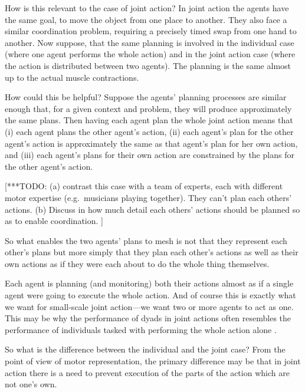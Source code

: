 \documentclass[12pt,\papersize]{extarticle}
\begin{document}
How is this relevant to the case of joint action?
In joint action the agents have the same goal, to move the object from one place to another.
They also face a similar coordination problem, requiring a precisely timed swap from one hand to another.
Now suppose, that the same planning is involved in the individual case (where one agent performs the whole action) and in the joint action case (where the action is distributed between two agents).
The planning is the same almost up to the actual muscle contractions.

How could this be helpful?
Suppose the agents' planning processes are similar enough that, for a given context and problem, they will produce approximately the same plans.
Then having each agent plan the whole joint action means that (i) each agent plans the other agent's action,
(ii) each agent's plan for the other agent's action is approximately the same as that agent's plan for her own action,
and 
(iii) each  agent's plans for their own action are constrained by the plans for the other agent's action.

[***TODO: (a) contrast this case with a team of experts, each with different motor expertise (e.g.\ musicians playing together).  
They can't plan each others' actions.
(b) Discuss in how much detail each others' actions should be planned so as to enable coordination.
]


So what enables the two agents' plans to mesh is not that they represent each other's plans but more simply that they plan each other's actions as well as their own actions as if they were each about to do the whole thing themselves.

Each agent is planning (and monitoring) both their actions almost as if a single agent were going to execute the whole action.
And of course this is exactly what we want for small-scale joint action---we want two or more agents to act as one.
This may be why the performance of dyads in joint actions often resembles the performance of individuals tasked with performing the whole action alone \citep{Knoblich:2003nf}.

So what is the difference between the individual and the joint case?  From the point of view of motor representation, the primary difference may be that in joint action there is a need to prevent execution of the parts of the action which are not one’s own.

\end{document}

